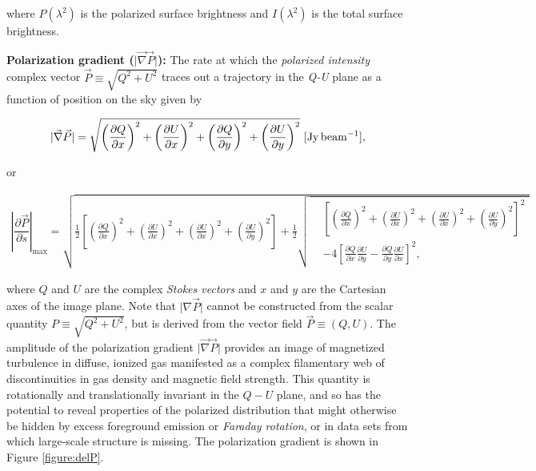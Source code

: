 \documentclass[a4paper,10pt]{article}
\begin{document}
{\noindent}where $P(\lambda^2)$ is the polarized surface brightness and $I(\lambda^2)$ is the total surface brightness.

{\noindent}\textbf{Polarization gradient ($\lvert\vec{\nabla}\vec{P}\rvert$):} The rate at which the \textit{polarized intensity} complex vector $\vec{P}\equiv\sqrt{Q^2+U^2}$ traces out a trajectory in the \textit{Q-U} plane as a function of position on the sky given by

\begin{align*}
    \lvert\vec\nabla\vec{P}\rvert = \sqrt{\left(\frac{\partial Q}{\partial x}\right)^2 + \left(\frac{\partial U}{\partial x}\right)^2 + \left(\frac{\partial Q}{\partial y}\right)^2 + \left(\frac{\partial U}{\partial y}\right)^2} ~ [{\rm Jy\,beam^{-1}}],
\end{align*}

{\noindent}or

\begin{equation*}
\begin{split}
\left\lvert\dfrac{\partial\vec{P}}{\partial s}\right\rvert_\mathrm{max} = \sqrt{ \frac{1}{2}\left[ \left(\frac{\partial Q}{\partial x}\right)^2 + \left(\frac{\partial U}{\partial x}\right)^2 + \left(\frac{\partial U}{\partial x}\right)^2 + \left(\frac{\partial U}{\partial y}\right)^2 \right] + \frac{1}{2} 
  \sqrt{
    \begin{aligned}
    & \left[ \left(\frac{\partial Q}{\partial x}\right)^2 + \left(\frac{\partial U}{\partial x}\right)^2 + \left(\frac{\partial U}{\partial x}\right)^2 + \left(\frac{\partial U}{\partial y}\right)^2 \right]^2 \\
    &- 4\left[ \frac{\partial Q}{\partial x}\frac{\partial U}{\partial y} - \frac{\partial Q}{\partial y}\frac{\partial U}{\partial x}  \right]^2,
    \end{aligned}
    }}
\end{split}
\end{equation*}

{\noindent}where $Q$ and $U$ are the complex \textit{Stokes vectors} and $x$ and $y$ are the Cartesian axes of the image plane. Note that $\lvert\nabla\vec{P}\rvert$ cannot be constructed from the scalar quantity $P\equiv\sqrt{Q^2+U^2}$, but is derived from the vector field $\vec{P}\equiv(Q,U)$. The amplitude of the polarization gradient $\lvert\vec\nabla\vec{P}\rvert$ provides an image of magnetized turbulence in diffuse, ionized gas manifested as a complex filamentary web of discontinuities in gas density and magnetic field strength. This quantity is rotationally and translationally invariant in the $Q-U$ plane, and so has the potential to reveal properties of the polarized distribution that might otherwise be hidden by excess foreground emission or \textit{Faraday rotation}, or in data sets from which large-scale structure is missing. The polarization gradient is shown in Figure \ref{figure:delP}.
\end{document}

